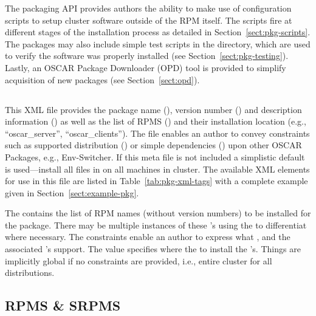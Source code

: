 The packaging API provides authors the ability to make use of configuration
scripts to setup cluster software outside of the RPM itself.  The scripts
fire at different stages of the installation process as detailed in
Section~\ref{sect:pkg-scripts}.  The packages may also include simple test
scripts in the  directory, which are used to verify the
software was properly installed (see Section~\ref{sect:pkg-testing}).
Lastly, an OSCAR Package Downloader (OPD) tool is provided to simplify
acquisition of new packages (see Section~\ref{sect:opd}).




\subsection{}
\label{sect:pkg-config-xml}

This XML file provides the package name (), version number
() and description information () as
well as the list of RPMS () and their installation location
(e.g., ``oscar\_server'', ``oscar\_clients'').   The file enables an author
to convey constraints such as supported distribution () or
simple dependencies () upon other OSCAR Packages, e.g.,
Env-Switcher.  If this meta file is not included a simplistic default is
used---install all files in  on all machines in cluster.
The available XML elements for use in this file are listed in
Table~\ref{tab:pkg-xml-tags} with a complete example given in
Section~\ref{sect:example-pkg}.

The  contains the list of RPM names (without version
numbers) to be installed for the package.  There may be multiple instances
of these 's using the  to differentiat where
necessary.  The  constraints enable an author to express
what ,  and
 the associated 's support.  The 
value specifies where the to install the 's.   Things are
implicitly global if no constraints are provided, i.e., entire cluster for
all distributions.




\subsection{RPMS \& SRPMS}
\label{sect:pkg-rpms-srpms}

